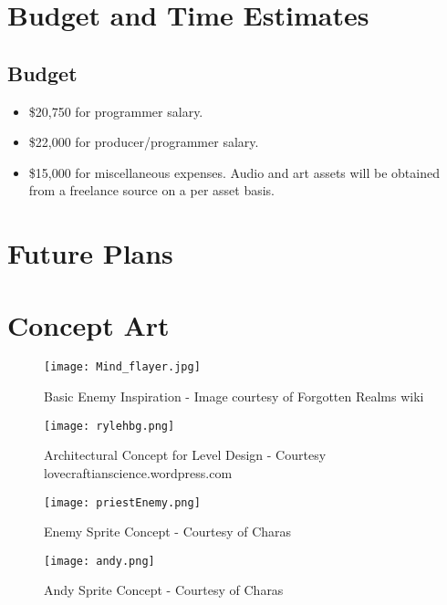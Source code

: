 \documentclass [12pt]{article}
\begin{document}
\section*{Budget and Time Estimates}

\subsection*{Budget}

\begin{itemize}
\item \$20,750 for programmer salary.
\item \$22,000 for producer/programmer salary.
\item \$15,000 for miscellaneous expenses. Audio and art assets will be obtained from a freelance source on a per asset basis.
\end{itemize}
\newpage

\section*{Future Plans}

\section*{Concept Art}
\begin{figure}[!htb]
	\texttt{[image: Mind\_flayer.jpg]}
	\caption{Basic Enemy Inspiration - Image courtesy of Forgotten Realms wiki}
\end{figure}

\begin{figure}[!htb]
\centering
	\texttt{[image: rylehbg.png]}
	\caption{Architectural Concept for Level Design - Courtesy lovecraftianscience.wordpress.com}
\end{figure}
\clearpage

\begin{figure}[!htb]
\centering
	\texttt{[image: priestEnemy.png]}
	\caption{Enemy Sprite Concept - Courtesy of Charas}
\end{figure}

\begin{figure}[!htb]
\centering
	\texttt{[image: andy.png]}
	\caption{Andy Sprite Concept - Courtesy of Charas}
\end{figure}
\end{document}
